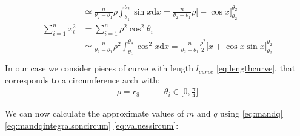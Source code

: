 \begin{itemize}
\begin{itemize}
\begin{align}
\begin{split}
& \simeq  \frac{n}{\theta_2 - \theta_1}  \rho \int_{\theta_1}^{\theta_2}{\sin{x}\mathrm  {d}x} = \frac{n}{\theta_2 - \theta_1}  \rho \Big[-\cos{x} \Big]_{\theta_2}^{\theta_2}\\
 \sum_{i=1}^{n}{x_i^2} &= \sum_{i=1}^{n}{\rho^2\cos^2{\theta_i}} \\
& \simeq  \frac{n}{\theta_2 - \theta_1}  \rho^2 \int_{\theta_1}^{\theta_2}{\cos^2{x}\mathrm  {d}x} =  \frac{n}{\theta_2 - \theta_1}  \frac{ \rho^2}{2} \Big[ x+\cos{x} \sin{x}\Big]_{\theta_2}^{\theta_2}\\
\end{split}
\label{eq:mandqintegralsoncircum}
\end{align}
In our case we consider pieces of curve with length $l_{curve}$ \ref{eq:lengthcurve}, that corresponds to a circumference arch with:
\begin{align}
\rho = r_{8}  \ \ \ \ \ \ \ \ \ \ \ \ \ 
\theta_i \in \Big[0,\frac{\pi}{4}\Big]
\label{eq:valuessircum}
\end{align}

We can now calculate the approximate values of $m$ and $q$ using \ref{eq:mandq} \ref{eq:mandqintegralsoncircum} \ref{eq:valuessircum}:


\end{itemize}
\end{itemize}
